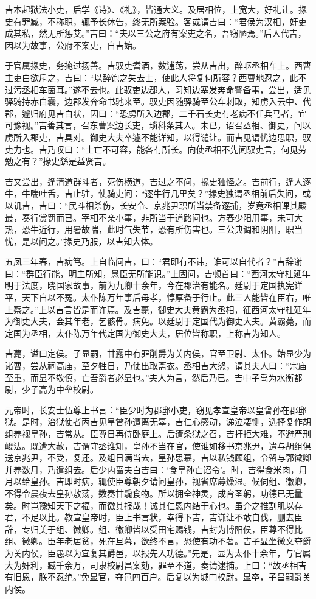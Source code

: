 \documentclass[]{article}
\begin{document}
吉本起狱法小吏，后学《诗》、《礼》，皆通大义。及居相位，上宽大，好礼让。掾史有罪臧，不称职，辄予长休告，终无所案验。客或谓吉曰：``君侯为汉相，奸吏成其私，然无所惩艾。''吉曰：``夫以三公之府有案吏之名，吾窃陋焉。''后人代吉，因以为故事，公府不案吏，自吉始。

于官属掾史，务掩过扬善。吉驭吏耆酒，数逋荡，尝从吉出，醉呕丞相车上。西曹主吏白欲斥之，吉曰：``以醉饱之失去士，使此人将复何所容？西曹地忍之，此不过污丞相车茵耳。''遂不去也。此驭吏边郡人，习知边塞发奔命警备事，尝出，适见驿骑持赤白囊，边郡发奔命书驰来至。驭吏因随驿骑至公车刺取，知虏入云中、代郡，遽归府见吉白状，因曰：``恐虏所入边郡，二千石长吏有老病不任兵马者，宜可豫视。''吉善其言，召东曹案边长吏，琐科条其人。未已，诏召丞相、御史，问以虏所入郡吏，吉具对。御史大夫卒遽不能详知，以得谴让。而吉见谓忧边思职，驭吏力也。吉乃叹曰：``士亡不可容，能各有所长。向使丞相不先闻驭吏言，何见劳勉之有？''掾史繇是益贤吉。

吉又尝出，逢清道群斗者，死伤横道，吉过之不问，掾史独怪之。吉前行，逢人逐牛，牛喘吐舌，吉止驻，使骑吏问：``逐牛行几里矣？''掾史独谓丞相前后失问，或以讥吉，吉曰：``民斗相杀伤，长安令、京兆尹职所当禁备逐捕，岁竟丞相课其殿最，奏行赏罚而已。宰相不亲小事，非所当于道路问也。方春少阳用事，未可大热，恐牛近行，用暑故喘，此时气失节，恐有所伤害也。三公典调和阴阳，职当忧，是以问之。''掾史乃服，以吉知大体。

五凤三年春，吉病笃。上自临问吉，曰：``君即有不讳，谁可以自代者？''吉辞谢曰：``群臣行能，明主所知，愚臣无所能识。''上固问，吉顿首曰：``西河太守杜延年明于法度，晓国家故事，前为九卿十余年，今在郡治有能名。廷尉于定国执宪详平，天下自以不冤。太仆陈万年事后母孝，惇厚备于行止。此三人能皆在臣右，唯上察之。''上以吉言皆是而许焉。及吉薨，御史大夫黄霸为丞相，征西河太守杜延年为御史大夫，会其年老，乞骸骨。病免。以廷尉于定国代为御史大夫。黄霸薨，而定国为丞相，太仆陈万年代定国为御史大夫，居位皆称职，上称吉为知人。

吉薨，谥曰定侯。子显嗣，甘露中有罪削爵为关内侯，官至卫尉、太仆。始显少为诸曹，尝从祠高庙，至夕牲日，乃使出取斋衣。丞相吉大怒，谓其夫人曰：``宗庙至重，而显不敬慎，亡吾爵者必显也。''夫人为言，然后乃已。吉中子禹为水衡都尉，少子高为中垒校尉。

元帝时，长安士伍尊上书言：``臣少时为郡邸小吏，窃见孝宣皇帝以皇曾孙在郡邸狱。是时，治狱使者丙吉见皇曾孙遭离无辜，吉仁心感动，涕泣凄恻，选择复作胡组养视皇孙，吉常从。臣尊日再侍卧庭上。后遭条狱之召，吉扞拒大难，不避严刑峻法。既遭大赦，吉谓守丞谁知，皇孙不当在官，使谁如移书京兆尹，遣与胡组俱送京兆尹，不受，复还。及组日满当去，皇孙思慕，吉以私钱顾组，令留与郭徽卿并养数月，乃遣组去。后少内啬夫白吉曰：`食皇孙亡诏令'。时，吉得食米肉，月月以给皇孙。吉即时病，辄使臣尊朝夕请问皇孙，视省席蓐燥湿。候伺组、徽卿，不得令晨夜去皇孙敖荡，数奏甘毳食物。所以拥全神灵，成育圣躬，功德已无量矣。时岂豫知天下之福，而徼其报哉！诚其仁恩内结于心也。虽介之推割肌以存君，不足以比。教宣皇帝时，臣上书言状，幸得下吉，吉谦让不敢自伐，删去臣辞，专归美于组、徽卿。组、徽卿皆以受田宅赐钱，吉封为博阳侯，臣尊不得比组、徽卿。臣年老居贫，死在旦暮，欲终不言，恐使有功不著。吉子显坐微文夺爵为关内侯，臣愚以为宜复其爵邑，以报先入功德。''先是，显为太仆十余年，与官属大为奸利，臧千余万，司隶校尉昌案劾，罪至不道，奏请逮捕。上曰：``故丞相吉有旧恩，朕不忍绝。''免显官，夺邑四百户。后复以为城门校尉。显卒，子昌嗣爵关内侯。
\end{document}
